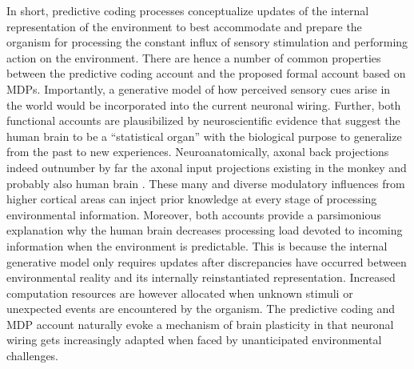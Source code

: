 \documentclass[10pt,letterpaper]{article}
\begin{document}
In short, predictive coding processes
conceptualize updates of the internal representation of the environment
to best accommodate and prepare the organism
for processing the constant influx of sensory stimulation and
performing action on the environment.
There are hence a number of common properties
between the predictive coding account
and the proposed formal account based on MDPs.
Importantly,
a generative model of how perceived sensory cues arise in the
world would be incorporated into
the current neuronal wiring.
Further,
both functional accounts are plausibilized by
neuroscientific evidence that suggest
the human brain to be a ``statistical organ'' \citep{friston2014phantastic}
with the biological purpose to
generalize from the past to new experiences.
Neuroanatomically, axonal
back projections indeed outnumber by far the axonal input projections
existing in the monkey and probably also human brain
\citep{salin1995corticocortical}.
These many and diverse modulatory influences from higher cortical areas
can inject prior knowledge
at every stage of processing environmental information.
Moreover,
both accounts provide a parsimonious explanation why the
human brain decreases processing load devoted to incoming information
when the environment is predictable.
This is because the internal generative
model only requires updates after discrepancies have occurred between
environmental reality and its internally reinstantiated representation.
Increased computation resources are however allocated
when unknown stimuli or
unexpected events are encountered by the organism.
The predictive coding and MDP account
naturally evoke a mechanism of brain plasticity in that
neuronal wiring gets increasingly adapted
when faced by unanticipated environmental challenges.
\end{document}

